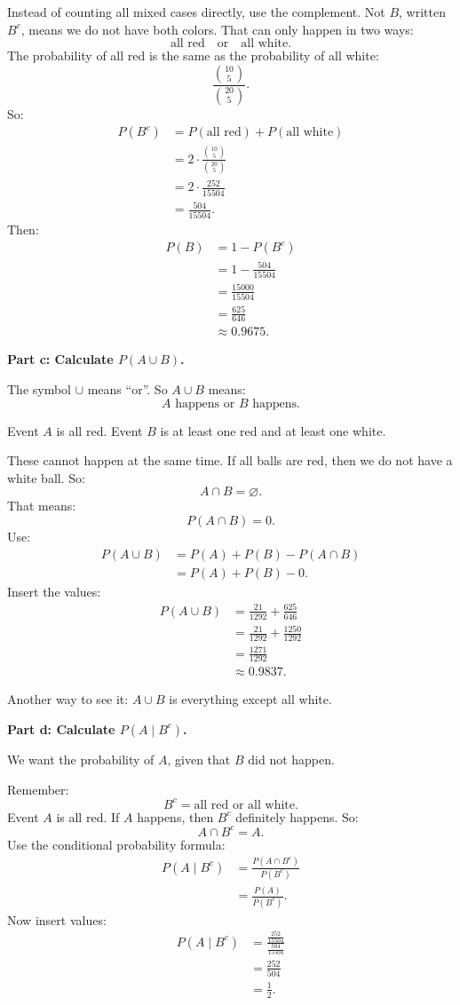 \documentclass[11pt,a4paper]{article}
\begin{document}
Instead of counting all mixed cases directly, use the complement. Not \(B\), written \(B^c\), means we do not have both colors. That can only happen in two ways:
\[
\text{all red} \quad \text{or} \quad \text{all white}.
\]
The probability of all red is the same as the probability of all white:
\[
\frac{\binom{10}{5}}{\binom{20}{5}}.
\]
So:
\begin{align*}
P(B^c)
&=P(\text{all red})+P(\text{all white})\\
&=2\cdot \frac{\binom{10}{5}}{\binom{20}{5}}\\
&=2\cdot \frac{252}{15504}\\
&=\frac{504}{15504}.
\end{align*}
Then:
\begin{align*}
P(B)
&=1-P(B^c)\\
&=1-\frac{504}{15504}\\
&=\frac{15000}{15504}\\
&=\frac{625}{646}\\
&\approx 0.9675.
\end{align*}

\textbf{Part c: Calculate \(P(A\cup B)\).}

The symbol \(\cup\) means ``or''. So \(A\cup B\) means:
\[
A \text{ happens or } B \text{ happens}.
\]

Event \(A\) is all red. Event \(B\) is at least one red and at least one white.

These cannot happen at the same time. If all balls are red, then we do not have a white ball. So:
\[
A\cap B=\varnothing.
\]
That means:
\[
P(A\cap B)=0.
\]
Use:
\begin{align*}
P(A\cup B)
&=P(A)+P(B)-P(A\cap B)\\
&=P(A)+P(B)-0.
\end{align*}
Insert the values:
\begin{align*}
P(A\cup B)
&=\frac{21}{1292}+\frac{625}{646}\\
&=\frac{21}{1292}+\frac{1250}{1292}\\
&=\frac{1271}{1292}\\
&\approx 0.9837.
\end{align*}

Another way to see it: \(A\cup B\) is everything except all white.

\textbf{Part d: Calculate \(P(A\mid B^c)\).}

We want the probability of \(A\), given that \(B\) did not happen.

Remember:
\[
B^c=\text{all red or all white}.
\]
Event \(A\) is all red. If \(A\) happens, then \(B^c\) definitely happens. So:
\[
A\cap B^c=A.
\]
Use the conditional probability formula:
\begin{align*}
P(A\mid B^c)
&=\frac{P(A\cap B^c)}{P(B^c)}\\
&=\frac{P(A)}{P(B^c)}.
\end{align*}
Now insert values:
\begin{align*}
P(A\mid B^c)
&=\frac{\frac{252}{15504}}{\frac{504}{15504}}\\
&=\frac{252}{504}\\
&=\frac{1}{2}.
\end{align*}
\end{document}
